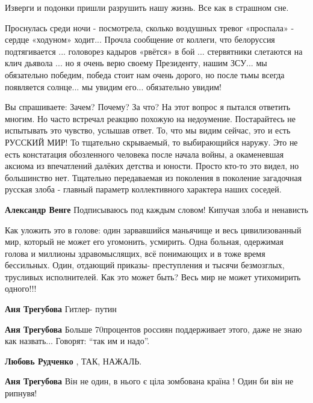 \begin{itemize}
Изверги и подонки пришли разрушить нашу жизнь. Все как в страшном сне.


Проснулась среди ночи - посмотрела, сколько воздушных тревог «проспала» -
сердце «ходуном» ходит... Прочла сообщение от коллеги, что белоруссия
подтягивается ... головорез кадыров «рвётся» в бой ... стервятники слетаются на
клич дьявола ... но я очень верю своему Президенту, нашим ЗСУ... мы обязательно
победим, победа стоит нам очень дорого, но после тьмы всегда появляется солнце...
мы увидим его... обязательно увидим!


Вы спрашиваете: Зачем? Почему? За что? На этот вопрос я пытался ответить
многим. Но часто встречал реакцию похожую на недоумение. Постарайтесь не
испытывать это чувство, услышав ответ. То, что мы видим сейчас, это и есть
РУССКИЙ МИР! То тщательно скрываемый, то выбирающийся наружу. Это не есть
констатация обозленного человека после начала войны, а окаменевшая аксиома из
впечатлений далёких детства и юности. Просто кто-то это видел, но большинство
нет. Тщательно передаваемая из поколения в поколение загадочная русская злоба -
главный параметр коллективного характера наших соседей.

\textbf{Александр Венге} Подписываюсь под каждым словом! Кипучая злоба и ненависть


Как уложить это в голове: один зарвавшийся маньячище и весь цивилизованный
мир, который не может его угомонить, усмирить. Одна больная, одержимая голова и
миллионы здравомыслящих, всё понимающих и в тоже время бессильных. Один, отдающий
приказы- преступления и тысячи безмозглых, трусливых исполнителей. Как это может
быть? Весь мир не может утихомирить одного!!!

\begin{itemize} %
\textbf{Аня Трегубова} Гитлер- путин

\textbf{Аня Трегубова} Больше 70процентов россиян поддерживает этого, даже не знаю как назвать... Говорят: \enquote{так им и надо}.

\textbf{Любовь Рудченко }, ТАК, НАЖАЛЬ.

\textbf{Аня Трегубова} Він не один, в нього є ціла зомбована країна ! Один би він не рипнувя!
\end{itemize} %


\end{itemize}
